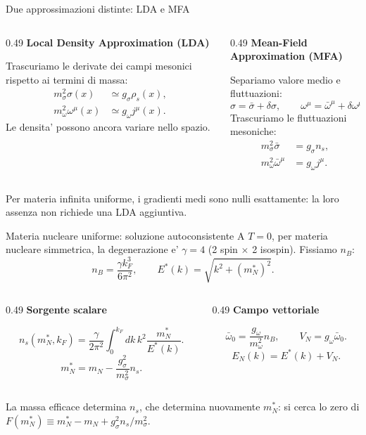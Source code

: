\begin{frame}{Due approssimazioni distinte: LDA e MFA}
\small
\begin{columns}[T,onlytextwidth]
\begin{column}{0.49\textwidth}
\textbf{Local Density Approximation (LDA)}\par\smallskip
Trascuriamo le derivate dei campi mesonici
rispetto ai termini di massa:
\[
\begin{aligned}
m_\sigma^2\sigma(x)&\simeq g_\sigma\rho_s(x),\\
m_\omega^2\omega^\mu(x)&\simeq g_\omega j^\mu(x).
\end{aligned}
\]
Le densita' possono ancora variare nello spazio.
\end{column}
\begin{column}{0.49\textwidth}
\textbf{Mean-Field Approximation (MFA)}\par\smallskip
Separiamo valore medio e fluttuazioni:
\[
\sigma=\bar\sigma+\delta\sigma,
\qquad\omega^\mu=\bar\omega^\mu+\delta\omega^\mu.
\]
Trascuriamo le fluttuazioni mesoniche:
\[
\begin{aligned}
m_\sigma^2\bar\sigma&=g_\sigma n_s,\\
m_\omega^2\bar\omega^\mu&=g_\omega j^\mu.
\end{aligned}
\]
\end{column}
\end{columns}
\medskip
Per materia infinita uniforme, i gradienti medi sono nulli esattamente:
la loro assenza non richiede una LDA aggiuntiva.
\end{frame}

\begin{frame}{Materia nucleare uniforme: soluzione autoconsistente}
\footnotesize
A \(T=0\), per materia nucleare simmetrica, la degenerazione e' \(\gamma=4\)
(2 spin \(\times\) 2 isospin). Fissiamo \(n_B\):
\[
n_B=\frac{\gamma k_F^3}{6\pi^2},
\qquad E^*(k)=\sqrt{k^2+(m_N^*)^2}.
\]
\begin{columns}[T,onlytextwidth]
\begin{column}{0.49\textwidth}
\textbf{Sorgente scalare}\par\smallskip
\[
n_s(m_N^*,k_F)=\frac{\gamma}{2\pi^2}
\int_0^{k_F}\!dk\,k^2\frac{m_N^*}{E^*(k)}.
\]
\[
m_N^*=m_N-\frac{g_\sigma^2}{m_\sigma^2}n_s.
\]
\end{column}
\begin{column}{0.49\textwidth}
\textbf{Campo vettoriale}\par\smallskip
\[
\bar\omega_0=\frac{g_\omega}{m_\omega^2}n_B,
\qquad V_N=g_\omega\bar\omega_0.
\]
\[
E_N(k)=E^*(k)+V_N.
\]
\end{column}
\end{columns}
\medskip
La massa efficace determina \(n_s\), che determina nuovamente \(m_N^*\):
si cerca lo zero di \(F(m_N^*)\equiv m_N^*-m_N+g_\sigma^2 n_s/m_\sigma^2\).
\end{frame}

